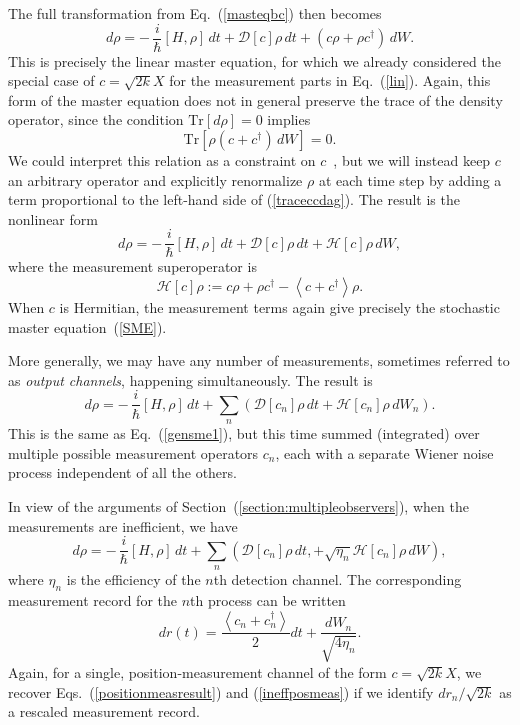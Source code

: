 \documentclass[12pt,aps,onecolum,superscriptaddress,footinbib,floatfix,showpacs]{revtex4-1}
\def\expct#1{\!\left\langle{#1}\right\rangle}
\begin{document}
The full transformation from Eq.~(\ref{masteqbc}) then becomes
\begin{equation}
  d\rho = -\,\frac{i}{\hbar}[H,\rho]\,dt + \mathcal{D}[c]\rho \,dt
   + \left(c\rho+\rho c^\dagger\right)\, dW. 
\end{equation}
This is precisely the linear master equation, for which we already
considered the special case of $c=\sqrt{2k}X$ for the measurement
parts in Eq.~(\ref{lin}).
Again, this form of the master equation does not in general preserve the trace of the
density operator, since the condition $\mathrm{Tr}[d\rho]=0$ implies
\begin{equation}
  \mathrm{Tr}\left[\rho\left(c+c^\dagger\right)\,dW\right]=0.
  \label{traceccdag}
\end{equation}
We could interpret this relation as a constraint on $c$~\cite{Adler00}, 
but we will instead 
keep $c$ an arbitrary operator and explicitly renormalize
$\rho$ at each time step by adding a term proportional to the
left-hand side of (\ref{traceccdag}).
The result is the nonlinear form
\begin{equation}
  d\rho = -\,\frac{i}{\hbar}[H,\rho]\,dt + \mathcal{D}[c]\rho \,dt
   + \mathcal{H}[c]\rho\, dW,
   \label{gensme1}
\end{equation}
where the measurement superoperator is 
\begin{equation}
  \mathcal{H}[c]\rho := c\rho + \rho c^\dagger - \expct{c+c^\dagger}\rho.
\end{equation}
When $c$ is Hermitian, the measurement terms again give 
precisely the stochastic master equation~(\ref{SME}).

More generally, we may have any number of measurements, sometimes 
referred to as {\em output channels}, happening simultaneously. The result is 
\begin{equation}
  d\rho = -\,\frac{i}{\hbar}[H,\rho]\,dt + \sum_n \left(\mathcal{D}[c_n]\rho\,dt
   + \mathcal{H}[c_n]\rho\, dW_n\right).
\end{equation}
This is the same as Eq.~(\ref{gensme1}), but this time summed
(integrated) over multiple possible measurement operators $c_n$, each
with a separate Wiener noise process independent of all the others.  

In view of the arguments of Section~(\ref{section:multipleobservers}), when 
the measurements are inefficient, we have  
\begin{equation}
  d\rho = -\,\frac{i}{\hbar}[H,\rho]\,dt + \sum_n \left(\mathcal{D}[c_n]\rho\,dt,
   + \sqrt{\eta_n} \mathcal{H}[c_n]\rho\, dW\right), 
  \label{generalmasteqn}
\end{equation}
where $\eta_n$ is the efficiency of the $n$th detection channel.
The corresponding measurement record for the $n$th process
can be written
\begin{equation} 
  dr(t) = \frac{\expct{c_n+c_n^\dagger}}{2}dt + \frac{dW_n}{\sqrt{4 \eta_n}}.
\end{equation}
Again, for a single, position-measurement 
channel of the form $c=\sqrt{2k}X$, we recover  
Eqs.~(\ref{positionmeasresult}) and (\ref{ineffposmeas}) if we identify 
$dr_n/\sqrt{2k}$ as a rescaled measurement record.
\end{document}
